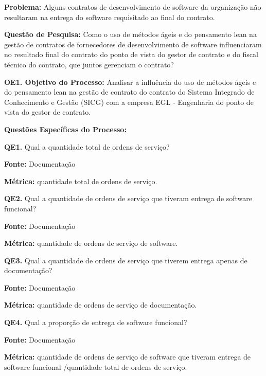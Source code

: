 \textbf{Problema:} Alguns contratos de desenvolvimento de software da organização não resultaram na entrega do software requisitado ao final do contrato.

\textbf{Questão de Pesquisa:} Como o uso de métodos ágeis e do pensamento lean na gestão de contratos de fornecedores de desenvolvimento de software influenciaram no resultado final do contrato do ponto de vista do gestor de contrato e do fiscal técnico do contrato, que juntos gerenciam o contrato?


\textbf{OE1. Objetivo do Processo:} Analisar a influência do uso de métodos ágeis e do pensamento lean na gestão de contrato do contrato do Sistema Integrado de Conhecimento e Gestão (SICG) com a empresa EGL - Engenharia do ponto de vista do gestor de contrato.

\textbf{Questões Específicas do Processo:}


\textbf{QE1.}  Qual a quantidade total de ordens de serviço?

\textbf{Fonte:} Documentação

\textbf{Métrica:} quantidade total de ordens de serviço.
 
\vspace{\onelineskip} 

\textbf{QE2.} Qual a quantidade de ordens de serviço que tiveram entrega de software funcional?

\textbf{Fonte:} Documentação

\textbf{Métrica:} quantidade de ordens de serviço de software.
 
 \vspace{\onelineskip} 

\textbf{QE3.} Qual a quantidade de ordens de serviço que tiverem entrega apenas de documentação?

\textbf{Fonte:} Documentação

\textbf{Métrica:} quantidade de ordens de serviço de documentação.

 \vspace{\onelineskip} 
 
\textbf{QE4.} Qual a proporção de entrega de software funcional?

\textbf{Fonte:} Documentação

\textbf{Métrica:} quantidade de ordens de serviço de software que tiveram entrega de software funcional /quantidade total de ordens de serviço.

 \vspace{\onelineskip} 


